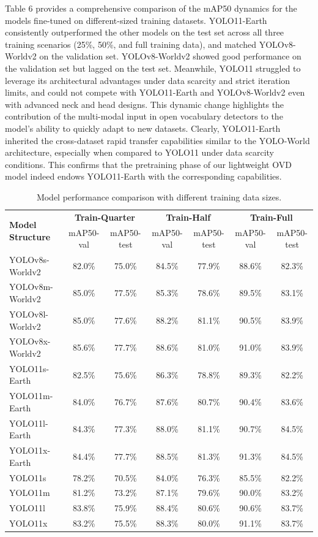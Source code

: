 \documentclass{article}
\begin{document}
Table 6 provides a comprehensive comparison of the mAP50 dynamics for the models fine-tuned on different-sized training datasets. YOLO11-Earth consistently outperformed the other models on the test set across all three training scenarios (25\%, 50\%, and full training data), and matched YOLOv8-Worldv2 on the validation set. YOLOv8-Worldv2 showed good performance on the validation set but lagged on the test set. Meanwhile, YOLO11 struggled to leverage its architectural advantages under data scarcity and strict iteration limits, and could not compete with YOLO11-Earth and YOLOv8-Worldv2 even with advanced neck and head designs. This dynamic change highlights the contribution of the multi-modal input in open vocabulary detectors to the model's ability to quickly adapt to new datasets. Clearly, YOLO11-Earth inherited the cross-dataset rapid transfer capabilities similar to the YOLO-World architecture, especially when compared to YOLO11 under data scarcity conditions. This confirms that the pretraining phase of our lightweight OVD model indeed endows YOLO11-Earth with the corresponding capabilities.

\begin{table}[ht]
\centering
\caption{Model performance comparison with different training data sizes.}
\begin{tabular}{lcccccc}
\toprule
\multirow{2}{*}{\textbf{Model Structure}} & \multicolumn{2}{c}{\textbf{Train-Quarter}} & \multicolumn{2}{c}{\textbf{Train-Half}} & \multicolumn{2}{c}{\textbf{Train-Full}} \\
\cmidrule(lr){2-7}
 & mAP50-val & mAP50-test & mAP50-val & mAP50-test & mAP50-val & mAP50-test \\
\midrule
YOLOv8s-Worldv2 & 82.0\% & 75.0\% & 84.5\% & 77.9\% & 88.6\% & 82.3\% \\
YOLOv8m-Worldv2 & 85.0\% & 77.5\% & 85.3\% & 78.6\% & 89.5\% & 83.1\% \\
YOLOv8l-Worldv2 & 85.0\% & 77.6\% & 88.2\% & 81.1\% & 90.5\% & 83.9\% \\
YOLOv8x-Worldv2 & 85.6\% & 77.7\% & 88.6\% & 81.0\% & 91.0\% & 83.9\% \\
\midrule
YOLO11s-Earth   & 82.5\% & 75.6\% & 86.3\% & 78.8\% & 89.3\% & 82.2\% \\
YOLO11m-Earth   & 84.0\% & 76.7\% & 87.6\% & 80.7\% & 90.4\% & 83.6\% \\
YOLO11l-Earth   & 84.3\% & 77.3\% & 88.0\% & 81.1\% & 90.7\% & 84.5\% \\
YOLO11x-Earth   & 84.4\% & 77.7\% & 88.5\% & 81.3\% & 91.3\% & 84.5\% \\
\midrule
YOLO11s         & 78.2\% & 70.5\% & 84.0\% & 76.3\% & 85.5\% & 82.2\% \\
YOLO11m         & 81.2\% & 73.2\% & 87.1\% & 79.6\% & 90.0\% & 83.2\% \\
YOLO11l         & 83.8\% & 75.9\% & 88.4\% & 80.6\% & 90.6\% & 83.7\% \\
YOLO11x         & 83.2\% & 75.5\% & 88.3\% & 80.0\% & 91.1\% & 83.7\% \\
\bottomrule
\end{tabular}
\end{table}
\end{document}
